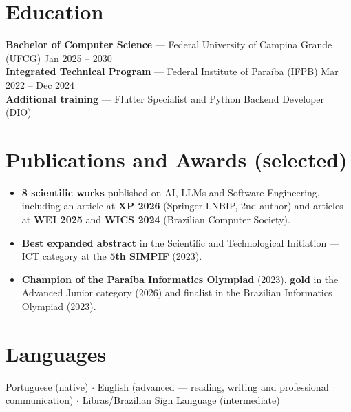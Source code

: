 \documentclass[10.5pt,a4paper]{article}
\begin{document}
\section*{Education}
\textbf{Bachelor of Computer Science} --- Federal University of Campina Grande (UFCG)
\hfill Jan 2025 -- 2030\\
\textbf{Integrated Technical Program} --- Federal Institute of Paraíba (IFPB)
\hfill Mar 2022 -- Dec 2024\\
\textbf{Additional training} --- Flutter Specialist and Python Backend Developer (DIO)

\section*{Publications and Awards (selected)}
\begin{itemize}
  \item \textbf{8 scientific works} published on AI, LLMs and Software Engineering, including an
        article at \textbf{XP 2026} (Springer LNBIP, 2nd author) and articles at \textbf{WEI 2025}
        and \textbf{WICS 2024} (Brazilian Computer Society).
  \item \textbf{Best expanded abstract} in the Scientific and Technological Initiation --- ICT
        category at the \textbf{5th SIMPIF} (2023).
  \item \textbf{Champion of the Paraíba Informatics Olympiad} (2023), \textbf{gold} in the Advanced
        Junior category (2026) and finalist in the Brazilian Informatics Olympiad (2023).
\end{itemize}

\section*{Languages}
Portuguese (native) $\cdot$ English (advanced --- reading, writing and professional communication)
$\cdot$ Libras/Brazilian Sign Language (intermediate)
\end{document}

